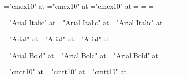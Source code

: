 \font\1="cmex10" at \largefont
\font\2="cmex10" at \normalfont
\font\3="cmex10" at \smallfont
{}=\1 =\2 =\3

\def\giantit  {\font\zfontz="Arial Italic" at \giantfont  \zfontz}
\def\hugeit   {\font\zfontz="Arial Italic" at \hugefont   \zfontz}
\def\largeit  {\font\zfontz="Arial Italic" at \largefont  \zfontz}
\def\normalit {\font\zfontz="Arial Italic" at \normalfont \zfontz}
\def\smallit  {\font\zfontz="Arial Italic" at \smallfont  \zfontz}
\def\tinyit   {\font\zfontz="Arial Italic" at \tinyfont   \zfontz}

\font\1="Arial Italic" at \largefont
\font\2="Arial Italic" at \normalfont
\font\3="Arial Italic" at \smallfont
{}=\1 =\2 =\3
\def\it{\fam=4}

\def\giantsl  {\font\zfontz="Arial" at \giantfont  \zfontz}
\def\hugesl   {\font\zfontz="Arial" at \hugefont   \zfontz}
\def\largesl  {\font\zfontz="Arial" at \largefont  \zfontz}
\def\normalsl {\font\zfontz="Arial" at \normalfont \zfontz}
\def\smallsl  {\font\zfontz="Arial" at \smallfont  \zfontz}
\def\tinysl   {\font\zfontz="Arial" at \tinyfont   \zfontz}

\font\1="Arial" at \largefont
\font\2="Arial" at \normalfont
\font\3="Arial" at \smallfont
{}=\1 =\2 =\3
\def\sl{\fam=5}

\def\giantbf  {\font\zfontz="Arial Bold" at \giantfont  \zfontz}
\def\hugebf   {\font\zfontz="Arial Bold" at \hugefont   \zfontz}
\def\largebf  {\font\zfontz="Arial Bold" at \largefont  \zfontz}
\def\normalbf {\font\zfontz="Arial Bold" at \normalfont \zfontz}
\def\smallbf  {\font\zfontz="Arial Bold" at \smallfont  \zfontz}
\def\tinybf   {\font\zfontz="Arial Bold" at \tinyfont   \zfontz}

\font\1="Arial Bold" at \largefont
\font\2="Arial Bold" at \normalfont
\font\3="Arial Bold" at \smallfont
{}=\1 =\2 =\3
\def\bf{\fam=6}

\def\hugett   {\font\zfontz="cmtt10" at \hugefont   \zfontz}
\def\largett  {\font\zfontz="cmtt10" at \largefont  \zfontz}
\def\normaltt {\font\zfontz="cmtt10" at \normalfont \zfontz}
\def\smalltt  {\font\zfontz="cmtt10" at \smallfont  \zfontz}
\def\tinytt   {\font\zfontz="cmtt10" at \tinyfont   \zfontz}

\font\1="cmtt10" at \largefont
\font\2="cmtt10" at \normalfont
\font\3="cmtt10" at \smallfont
{}=\1 =\2 =\3
\def\tt{\fam=7}

\def\giantbfit  {\font\zfontz="Arial Bold Italic" at \giantfont  \zfontz}
\def\hugebfit   {\font\zfontz="Arial Bold Italic" at \hugefont   \zfontz}
\def\largebfit  {\font\zfontz="Arial Bold Italic" at \largefont  \zfontz}
\def\normalbfit {\font\zfontz="Arial Bold Italic" at \normalfont \zfontz}
\def\smallbfit  {\font\zfontz="Arial Bold Italic" at \smallfont  \zfontz}
\def\tinybfit   {\font\zfontz="Arial Bold Italic" at \tinyfont   \zfontz}
